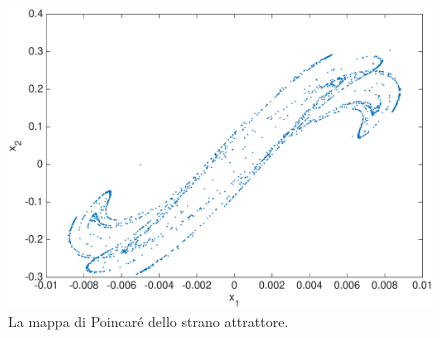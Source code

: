 \begin{figure}
    \centering
    \includegraphics[width=\textwidth]{matcont/PoincareCaos}
    \caption{La mappa di Poincaré dello strano attrattore.}
    \label{fig:chaos-poincare}
\end{figure}

